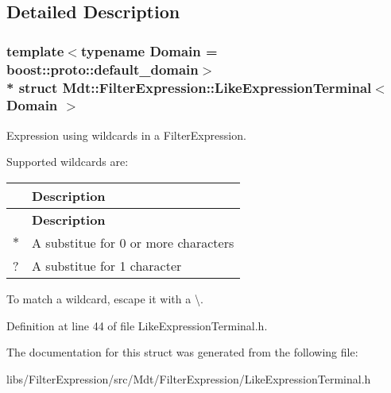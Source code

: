 \subsection{Detailed Description}
\subsubsection*{template$<$typename Domain = boost\+::proto\+::default\+\_\+domain$>$\\*
struct Mdt\+::\+Filter\+Expression\+::\+Like\+Expression\+Terminal$<$ Domain $>$}

Expression using wildcards in a Filter\+Expression. 

Supported wildcards are\+: \tabulinesep=1mm
\begin{longtabu} spread 0pt [c]{*2{|X[-1]}|}
\hline
{}&{\bf Description }\\
\endfirsthead
\hline
\endfoot
\hline
{}&{\bf Description }\\
\endhead
$\ast$&A substitue for 0 or more characters \\
?&A substitue for 1 character \\
\end{longtabu}


To match a wildcard, escape it with a \textquotesingle{}\textbackslash{}\textquotesingle{}. 

Definition at line 44 of file Like\+Expression\+Terminal.\+h.



The documentation for this struct was generated from the following file\+:\begin{DoxyCompactItemize}
\item 
libs/\+Filter\+Expression/src/\+Mdt/\+Filter\+Expression/Like\+Expression\+Terminal.\+h\end{DoxyCompactItemize}
